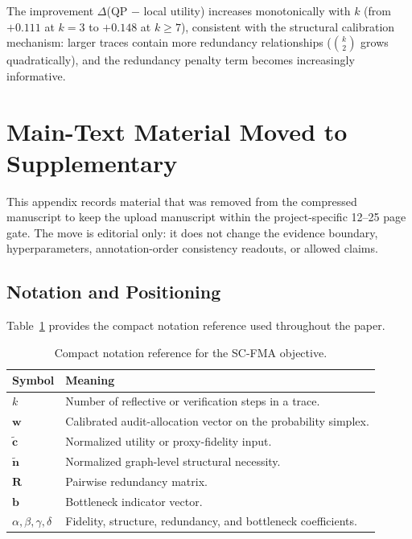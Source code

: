 \documentclass[a4paper,fleqn]{cas-sc}
\begin{document}
The improvement $\Delta$(QP $-$ local utility) increases monotonically with $k$ (from $+0.111$ at $k=3$ to $+0.148$ at $k \ge 7$), consistent with the structural calibration mechanism: larger traces contain more redundancy relationships ($\binom{k}{2}$ grows quadratically), and the redundancy penalty term becomes increasingly informative.

\section{Main-Text Material Moved to Supplementary}
\label{app:moved-main-material}

This appendix records material that was removed from the compressed manuscript to keep the upload manuscript within the project-specific 12--25 page gate. The move is editorial only: it does not change the evidence boundary, hyperparameters, annotation-order consistency readouts, or allowed claims.

\subsection{Notation and Positioning}
\label{app:notation-positioning}

Table~\ref{tab:supp-notation} provides the compact notation reference used throughout the paper.

\begin{table}[ht]
\caption{Compact notation reference for the SC-FMA objective.}
\label{tab:supp-notation}
\centering
\small
\begin{tabular}{ll}
\toprule
\textbf{Symbol} & \textbf{Meaning} \\
\midrule
$k$ & Number of reflective or verification steps in a trace. \\
$\mathbf{w}$ & Calibrated audit-allocation vector on the probability simplex. \\
$\tilde{\mathbf{c}}$ & Normalized utility or proxy-fidelity input. \\
$\tilde{\mathbf{n}}$ & Normalized graph-level structural necessity. \\
$\mathbf{R}$ & Pairwise redundancy matrix. \\
$\mathbf{b}$ & Bottleneck indicator vector. \\
$\alpha,\beta,\gamma,\delta$ & Fidelity, structure, redundancy, and bottleneck coefficients. \\
\bottomrule
\end{tabular}
\end{table}
\end{document}

